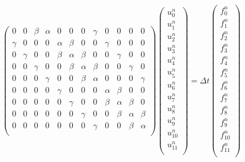\documentclass[11pt]{article}
\begin{document}
\begin{equation}
\begin{pmatrix}
0 & 0 & \beta & \alpha & 0 & 0 & 0 & \gamma & 0 & 0 & 0 & 0 \\
\gamma & 0 & 0 & 0 & \alpha & \beta & 0 & 0 & \gamma & 0 & 0 & 0 \\
0 & \gamma & 0 & 0 & \beta & \alpha & \beta & 0 & 0 & \gamma & 0 & 0 \\
0 & 0 & \gamma & 0 & 0 & \beta & \alpha & \beta & 0 & 0 & \gamma & 0 \\
0 & 0 & 0 & \gamma & 0 & 0 & \beta & \alpha & 0 & 0 & 0 & \gamma \\
0 & 0 & 0 & 0 & \gamma & 0 & 0 & 0 & \alpha & \beta & 0 & 0 \\
0 & 0 & 0 & 0 & 0 & \gamma & 0 & 0 & \beta & \alpha & \beta & 0 \\
0 & 0 & 0 & 0 & 0 & 0 & \gamma & 0 & 0 & \beta & \alpha & \beta \\
0 & 0 & 0 & 0 & 0 & 0 & 0 & \gamma & 0 & 0 & \beta & \alpha \\

\end{pmatrix}
\left(
\begin{array}{c}
u^{n}_{0}\\
u^{n}_{1}\\
u^{n}_{2}\\
u^{n}_{3}\\
u^{n}_{4}\\
u^{n}_{5}\\
u^{n}_{6}\\
u^{n}_{7}\\
u^{n}_{8}\\
u^{n}_{9}\\
u^{n}_{10}\\
u^{n}_{11}\\
\end{array}
\right)
=
\Delta t 
\left(
\begin{array}{c}
f^{n}_{0}\\
f^{n}_{1}\\
f^{n}_{2}\\
f^{n}_{3}\\
f^{n}_{4}\\
f^{n}_{5}\\
f^{n}_{6}\\
f^{n}_{7}\\
f^{n}_{8}\\
f^{n}_{9}\\
f^{n}_{10}\\
f^{n}_{11}\\
\end{array}
\right)
\label{eq:sysMat2}
\end{equation}
\end{document}
